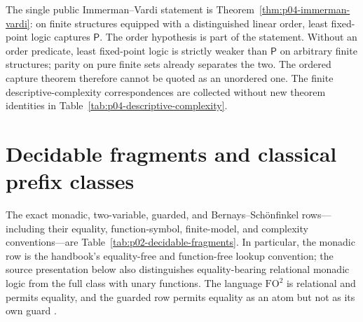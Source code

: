 The single public Immerman--Vardi statement is
Theorem~\ref{thm:p04-immerman-vardi}: on finite structures equipped with a
distinguished linear order, least fixed-point logic captures \(\mathsf P\).
The order hypothesis is part of the statement.  Without an order predicate,
least fixed-point logic is strictly weaker than \(\mathsf P\) on arbitrary
finite structures; parity on pure finite sets already separates the two.  The
ordered capture theorem therefore cannot be quoted as an unordered one.
The finite descriptive-complexity correspondences are collected without new
theorem identities in Table~\ref{tab:p04-descriptive-complexity}.










\section{Decidable fragments and classical prefix classes}
\label{sec:p09-decidable-fragments}

The exact monadic, two-variable, guarded, and
Bernays--Sch\"onfinkel rows---including their equality, function-symbol,
finite-model, and complexity conventions---are
Table~\ref{tab:p02-decidable-fragments}.  In particular, the monadic row is
the handbook's equality-free and function-free lookup convention; the source
presentation below also distinguishes equality-bearing relational monadic
logic from the full class with unary functions.  The language \(\mathrm{FO}^{2}\)
is relational and permits
equality, and the guarded row permits equality as an atom but not as its own
guard \cite{Behmann1922,Mortimer1975,AndrekaVanBenthemNemeti1998,
GradelKolaitisVardi1997,Gradel1999}.


